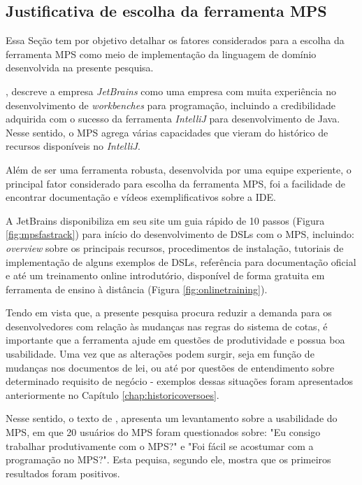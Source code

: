 
\subsection{Justificativa de escolha da ferramenta MPS}
\label{justificativamps}

Essa Seção tem por objetivo detalhar os fatores considerados para a escolha da ferramenta \gls{MPS} como meio de implementação da linguagem de domínio desenvolvida na presente pesquisa.

, descreve a empresa \textit{JetBrains} como uma empresa com muita experiência no desenvolvimento de \textit{workbenches} para programação, incluindo a credibilidade adquirida com o sucesso da ferramenta \textit{IntelliJ} para desenvolvimento de Java.  Nesse sentido, o \gls{MPS} agrega várias capacidades que vieram do histórico de recursos disponíveis no \textit{IntelliJ}. 

Além de ser uma ferramenta robusta, desenvolvida por uma equipe experiente, o principal fator considerado para escolha da ferramenta \gls{MPS}, foi a facilidade de encontrar documentação e vídeos exemplificativos sobre a \gls{IDE}. 

A JetBrains disponibiliza em seu site um guia rápido de 10 passos (Figura \ref{fig:mpsfastrack}) para início do desenvolvimento de \gls{DSL}s com o \gls{MPS}, incluindo: \textit{overview} sobre os principais recursos, procedimentos de instalação, tutoriais de implementação de alguns exemplos de \gls{DSL}s, referência para documentação oficial e até um treinamento online introdutório, disponível de forma gratuita em ferramenta de ensino à distância (Figura \ref{fig:onlinetraining}).  





\newpage
Tendo em vista que, a presente pesquisa procura reduzir a demanda para os desenvolvedores com relação às mudanças nas regras do sistema de cotas, é importante que a ferramenta ajude em questões de produtividade e possua boa usabilidade. Uma vez que as alterações podem surgir, seja em função de mudanças nos documentos de lei, ou até por questões de entendimento sobre determinado requisito de negócio - exemplos dessas situações foram apresentados anteriormente no Capítulo \ref{chap:historicoversoes}.

Nesse sentido, o texto de  , apresenta um levantamento sobre a usabilidade do \gls{MPS}, em que 20 usuários do \gls{MPS} foram questionados sobre: "Eu consigo trabalhar produtivamente com o MPS?" e "Foi fácil se acostumar com a programação no MPS?". Esta pequisa, segundo ele, mostra que os primeiros resultados foram positivos. 

